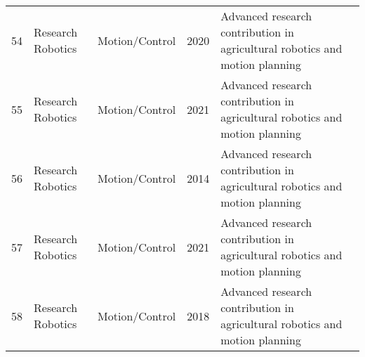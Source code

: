 \begin{table*}[htbp]
\begin{tabular}{p{}p{}p{}p{}p{}p{}}
 54 & Research Robotics & Motion/Control & 2020 & Advanced research contribution in agricultural robotics and motion planning & \cite{pourdarbani2020automatic} \\
 55 & Research Robotics & Motion/Control & 2021 & Advanced research contribution in agricultural robotics and motion planning & \cite{pranto2021blockchain} \\
 56 & Research Robotics & Motion/Control & 2014 & Advanced research contribution in agricultural robotics and motion planning & \cite{qiang2014identification} \\
 57 & Research Robotics & Motion/Control & 2021 & Advanced research contribution in agricultural robotics and motion planning & \cite{qiao2021detectors} \\
 58 & Research Robotics & Motion/Control & 2018 & Advanced research contribution in agricultural robotics and motion planning & \cite{r2018research} \\
\bottomrule
\end{tabular}
\end{table*}


